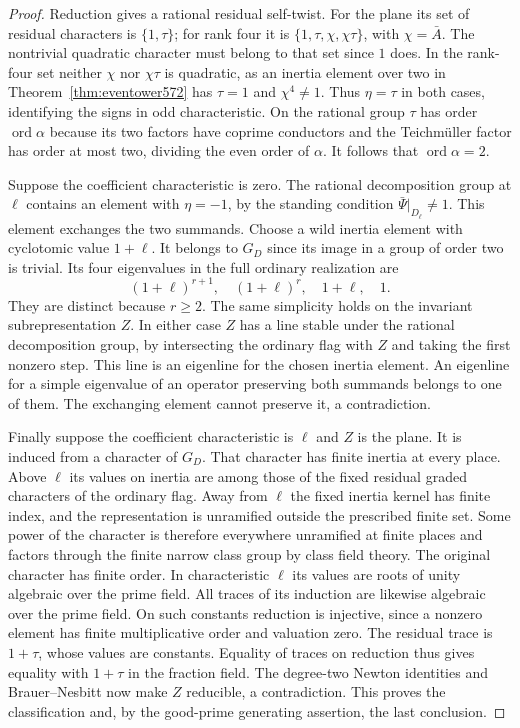 \documentclass[a4paper,11pt]{article}
\theoremstyle{definition}
\theoremstyle{remark}
\numberwithin{equation}{section}
\begin{document}
\begin{proof}
Reduction gives a rational residual self-twist. For the
plane its set of residual characters is \(\{1,\tau\}\);
for rank four it is \(\{1,\tau,\chi,\chi\tau\}\), with
\(\chi=\bar A\). The nontrivial quadratic character must
belong to that set since \(1\) does. In the rank-four set
neither \(\chi\) nor \(\chi\tau\) is quadratic, as an
inertia element over two in Theorem~\ref{thm:eventower572}
has \(\tau=1\) and \(\chi^4\ne1\). Thus \(\eta=\tau\)
in both cases, identifying the signs in odd characteristic.
On the rational group \(\tau\) has order \(\operatorname{ord}\alpha\)
because its two factors have coprime conductors and the Teichm\"uller
factor has order at most two, dividing the even order of
\(\alpha\). It follows that \(\operatorname{ord}\alpha=2\).

Suppose the coefficient characteristic is zero. The rational
decomposition group at \(\ell\) contains an element with
\(\eta=-1\), by the standing condition
\(\bar\Psi|_{D_\ell}\ne1\). This element exchanges the two
summands. Choose a wild inertia element with cyclotomic
value \(1+\ell\). It belongs to \(G_D\) since its image
in a group of order two is trivial. Its four eigenvalues
in the full ordinary realization are
\[
            (1+\ell)^{r+1},\quad (1+\ell)^r,\quad
                                 1+\ell,\quad 1 .
\]
They are distinct because \(r\ge2\). The same simplicity
holds on the invariant subrepresentation \(Z\). In either
case \(Z\) has a line stable under the rational decomposition
group, by intersecting the ordinary flag with \(Z\) and
taking the first nonzero step. This line is an eigenline
for the chosen inertia element. An eigenline for a simple
eigenvalue of an operator preserving both summands belongs
to one of them. The exchanging element cannot preserve it,
a contradiction.

Finally suppose the coefficient characteristic is \(\ell\)
and \(Z\) is the plane. It is induced from a character of
\(G_D\). That character has finite inertia at every place.
Above \(\ell\) its values on inertia are among those of
the fixed residual graded characters of the ordinary flag.
Away from \(\ell\) the fixed inertia kernel has finite
index, and the representation is unramified outside the
prescribed finite set. Some power of the character is
therefore everywhere unramified at finite places and factors
through the finite narrow class group by class field theory.
The original character has finite order. In characteristic
\(\ell\) its values are roots of unity algebraic over the
prime field. All traces of its induction are likewise
algebraic over the prime field. On such constants reduction
is injective, since a nonzero element has finite multiplicative
order and valuation zero. The residual trace is \(1+\tau\),
whose values are constants. Equality of traces on reduction
thus gives equality with \(1+\tau\) in the fraction field.
The degree-two Newton identities and Brauer--Nesbitt now
make \(Z\) reducible, a contradiction. This proves the
classification and, by the good-prime generating assertion,
the last conclusion.
\end{proof}
\end{document}
